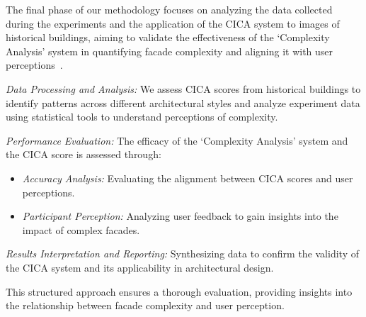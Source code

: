 %    

The final phase of our methodology focuses on analyzing the data collected during the experiments and the application of the CICA system to images of historical buildings, aiming to validate the effectiveness of the `Complexity Analysis' system in quantifying facade complexity and aligning it with user perceptions~.

\textit{Data Processing and Analysis:} We assess CICA scores from historical buildings to identify patterns across different architectural styles and analyze experiment data using statistical tools to understand perceptions of complexity.

\textit{Performance Evaluation:} The efficacy of the `Complexity Analysis' system and the CICA score is assessed through:
\begin{itemize}
    \item \textit{Accuracy Analysis:} Evaluating the alignment between CICA scores and user perceptions.
    \item \textit{Participant Perception:} Analyzing user feedback to gain insights into the impact of complex facades.
\end{itemize}

\textit{Results Interpretation and Reporting:} Synthesizing data to confirm the validity of the CICA system and its applicability in architectural design.


This structured approach ensures a thorough evaluation, providing insights into the relationship between facade complexity and user perception.







